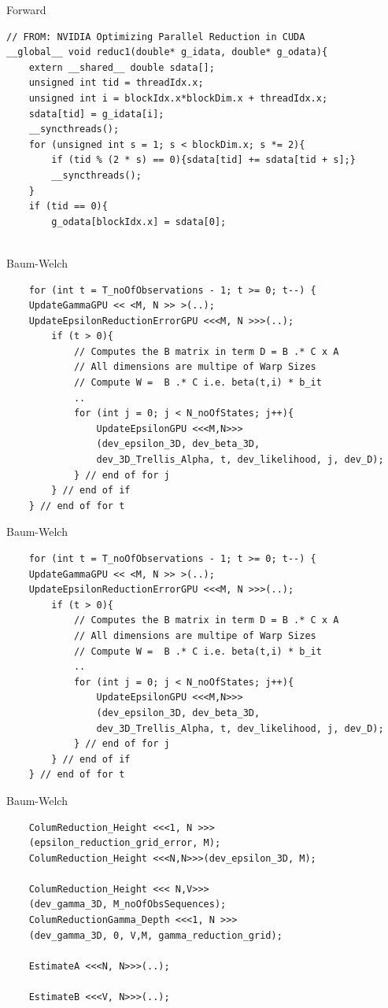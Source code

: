 \documentclass[11pt]{beamer}
\begin{document}
\begin{frame}[fragile]{Forward}
\begin{verbatim}
// FROM: NVIDIA Optimizing Parallel Reduction in CUDA
__global__ void reduc1(double* g_idata, double* g_odata){
	extern __shared__ double sdata[];
	unsigned int tid = threadIdx.x;
	unsigned int i = blockIdx.x*blockDim.x + threadIdx.x;
	sdata[tid] = g_idata[i];
	__syncthreads();
	for (unsigned int s = 1; s < blockDim.x; s *= 2){
		if (tid % (2 * s) == 0){sdata[tid] += sdata[tid + s];}
		__syncthreads();
	}
	if (tid == 0){
		g_odata[blockIdx.x] = sdata[0];
	
\end{verbatim}
\end{frame}


\begin{frame}[fragile]{Baum-Welch}
\begin{verbatim}
	for (int t = T_noOfObservations - 1; t >= 0; t--) {
	UpdateGammaGPU << <M, N >> >(..);
	UpdateEpsilonReductionErrorGPU <<<M, N >>>(..);
		if (t > 0){
			// Computes the B matrix in term D = B .* C x A
			// All dimensions are multipe of Warp Sizes
			// Compute W =  B .* C i.e. beta(t,i) * b_it
			..
			for (int j = 0; j < N_noOfStates; j++){
				UpdateEpsilonGPU <<<M,N>>>
				(dev_epsilon_3D, dev_beta_3D,
				dev_3D_Trellis_Alpha, t, dev_likelihood, j, dev_D);
			} // end of for j
		} // end of if
	} // end of for t
\end{verbatim}
\end{frame}

\begin{frame}[fragile]{Baum-Welch}
\begin{verbatim}
	for (int t = T_noOfObservations - 1; t >= 0; t--) {
	UpdateGammaGPU << <M, N >> >(..);
	UpdateEpsilonReductionErrorGPU <<<M, N >>>(..);
		if (t > 0){
			// Computes the B matrix in term D = B .* C x A
			// All dimensions are multipe of Warp Sizes
			// Compute W =  B .* C i.e. beta(t,i) * b_it
			..
			for (int j = 0; j < N_noOfStates; j++){
				UpdateEpsilonGPU <<<M,N>>>
				(dev_epsilon_3D, dev_beta_3D,
				dev_3D_Trellis_Alpha, t, dev_likelihood, j, dev_D);
			} // end of for j
		} // end of if
	} // end of for t
\end{verbatim}
\end{frame}

\begin{frame}[fragile]{Baum-Welch}
\begin{verbatim}
	ColumReduction_Height <<<1, N >>>
	(epsilon_reduction_grid_error, M);
	ColumReduction_Height <<<N,N>>>(dev_epsilon_3D, M);

	ColumReduction_Height <<< N,V>>>
	(dev_gamma_3D, M_noOfObsSequences);
	ColumReductionGamma_Depth <<<1, N >>>
	(dev_gamma_3D, 0, V,M, gamma_reduction_grid);

	EstimateA <<<N, N>>>(..);

	EstimateB <<<V, N>>>(..);
	\end{verbatim}
\end{frame}
\end{document}
